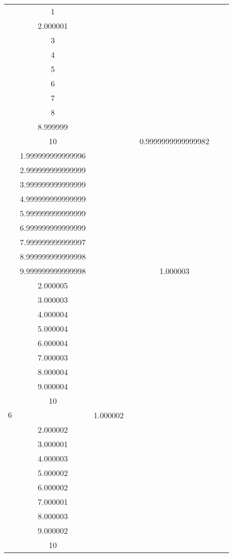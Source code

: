 \documentclass[oneside, final, 12pt]{extarticle}
\begin{document}
\begin{longtable}{|c|c|c|c|c|c|c|}
\begin{aligned}
& 1 \\ & 2.000001 \\ & 3 \\ & 4 \\ & 5 \\ & 6 \\ & 7 \\ & 8 \\ & 8.999999 \\ & 10 
\end{aligned} \)
& \( \begin{aligned}  \end{aligned} \) 
& \( \begin{aligned}
& 0.9999999999999982 \\ & 1.999999999999996 \\ & 2.999999999999999 \\ & 3.999999999999999 \\ & 4.999999999999999 \\ & 5.999999999999999 \\ & 6.999999999999999 \\ & 7.999999999999997 \\ & 8.999999999999998 \\ & 9.999999999999998 
\end{aligned} \)
& \( \begin{aligned}  \end{aligned} \) 
& \( \begin{aligned}
& 1.000003 \\ & 2.000005 \\ & 3.000003 \\ & 4.000004 \\ & 5.000004 \\ & 6.000004 \\ & 7.000003 \\ & 8.000004 \\ & 9.000004 \\ & 10 
\end{aligned} \)
& \( \begin{aligned}  \end{aligned} \) 
\\ \hline
    \(6\) & \( \begin{aligned}
& 1.000002 \\ & 2.000002 \\ & 3.000001 \\ & 4.000003 \\ & 5.000002 \\ & 6.000002 \\ & 7.000001 \\ & 8.000003 \\ & 9.000002 \\ & 10 

\end{aligned}
\end{longtable}
\end{document}
